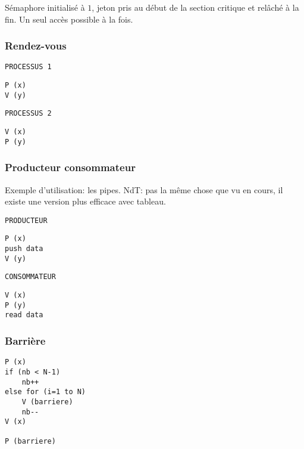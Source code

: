 \documentclass[a4paper]{article}
\begin{document}
\begin{multicols*}{2}
    Sémaphore initialisé à $1$, jeton pris au début de la section critique et relâché à la fin. Un seul accès possible à la fois. 

    \subsubsection{Rendez-vous}

    \begin{multicols}{2}
        \texttt{PROCESSUS 1}
        \begin{lstlisting}
P (x)
V (y)
        \end{lstlisting}

        \columnbreak{}
        
        \texttt{PROCESSUS 2}
        \begin{lstlisting}
V (x)
P (y)
        \end{lstlisting}
    \end{multicols}

    \subsubsection{Producteur consommateur}

    Exemple d'utilisation: les pipes.
    {NdT}: pas la même chose que vu en cours, il existe une version plus efficace avec tableau.

    \begin{multicols}{2}
        \texttt{PRODUCTEUR}
        \begin{lstlisting}
P (x) 
push data
V (y)
        \end{lstlisting}
        \columnbreak{}
        \texttt{CONSOMMATEUR}
        \hspace{0cm}
        \begin{lstlisting}
V (x) 
P (y) 
read data
        \end{lstlisting}
    \end{multicols}

    \subsubsection{Barrière}

    \begin{lstlisting}[frame=shadowbox]
P (x)
if (nb < N-1)
    nb++
else for (i=1 to N) 
    V (barriere)
    nb--
V (x)

P (barriere)
    \end{lstlisting}


\end{multicols*}
\end{document}
